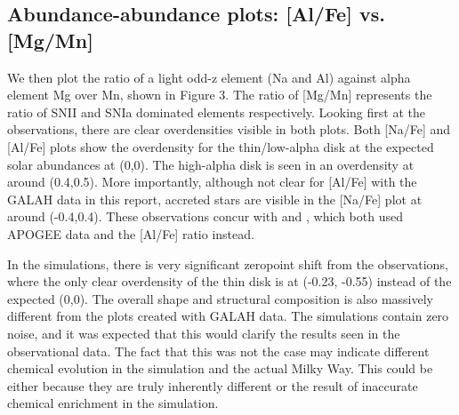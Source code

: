 \documentclass[fleqn,usenatbib]{mnras}
\begin{document}


\subsection{Abundance-abundance plots: [Al/Fe] vs. [Mg/Mn]} \label{sec:alfe_mgmn}

We then plot the ratio of a light odd-z element (Na and Al) against alpha element Mg over Mn, shown in Figure 3. The ratio of [Mg/Mn] represents the ratio of SNII and SNIa dominated elements respectively. Looking first at the observations, there are clear overdensities visible in both plots.  Both [Na/Fe] and [Al/Fe] plots show the overdensity for the thin/low-alpha disk at the expected solar abundances at (0,0). The high-alpha disk is seen in an overdensity at around (0.4,0.5). More importantly, although not clear for [Al/Fe] with the GALAH data in this report, accreted stars are visible in the [Na/Fe] plot at around (-0.4,0.4). These observations concur with \citet{Das2020} and \citet{Horta2020}, which both used APOGEE data and the [Al/Fe] ratio instead. \par 
In the simulations, there is very significant zeropoint shift from the observations, where the only clear overdensity of the thin disk is at (-0.23, -0.55) instead of the expected (0,0). The overall shape and structural composition is also massively different from the plots created with GALAH data. The simulations contain zero noise, and it was expected that this would clarify the results seen in the observational data. The fact that this was not the case may indicate different chemical evolution in the simulation and the actual Milky Way. This could be either because they are truly inherently different or the result of inaccurate chemical enrichment in the simulation. 
\end{document}
